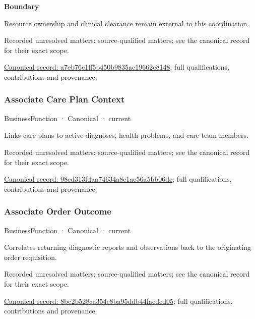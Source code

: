 \textbf{Boundary}



Resource ownership and clinical clearance remain external to this coordination.


{\small Recorded unresolved matters: source-qualified matters; see the canonical record for their exact scope.}\par
{\footnotesize \href{../../../../continuum/business/business-function/a7eb76c1ff5b450b9835ac19662c8148.md}{Canonical record: a7eb76c1ff5b450b9835ac19662c8148}; full qualifications, contributions and provenance.}\par
\subsubsection{Associate Care Plan Context}

\label{element:98cd313fdaa74634a8e1ae56a5bb06dc}
{\small BusinessFunction · Canonical · current}\par

Links care plans to active diagnoses, health problems, and care team members.


{\small Recorded unresolved matters: source-qualified matters; see the canonical record for their exact scope.}\par
{\footnotesize \href{../../../../continuum/business/business-function/98cd313fdaa74634a8e1ae56a5bb06dc.md}{Canonical record: 98cd313fdaa74634a8e1ae56a5bb06dc}; full qualifications, contributions and provenance.}\par
\subsubsection{Associate Order Outcome}

\label{element:8bc2b528ca354c8ba95ddb44facdcd05}
{\small BusinessFunction · Canonical · current}\par

Correlates returning diagnostic reports and observations back to the originating order requisition.


{\small Recorded unresolved matters: source-qualified matters; see the canonical record for their exact scope.}\par
{\footnotesize \href{../../../../continuum/business/business-function/8bc2b528ca354c8ba95ddb44facdcd05.md}{Canonical record: 8bc2b528ca354c8ba95ddb44facdcd05}; full qualifications, contributions and provenance.}\par
